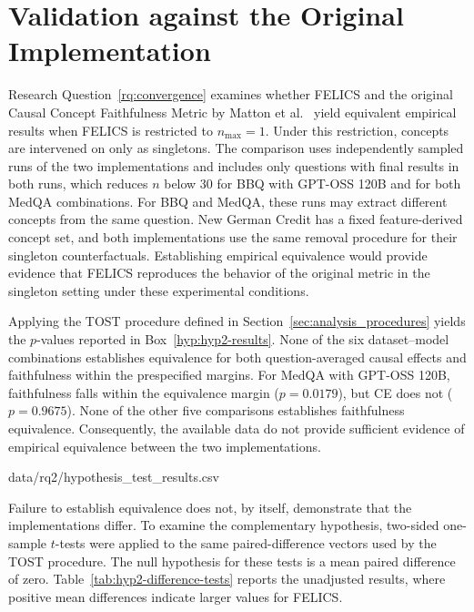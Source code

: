 \section{Validation against the Original Implementation}
\label{sec:results-original-validation}
Research Question~\ref{rq:convergence} examines whether FELICS and the original Causal Concept Faithfulness Metric by Matton et al.~\cite{mattonWalkTalkMeasuring2024} yield equivalent empirical results when FELICS is restricted to $n_{\max}=1$. Under this restriction, concepts are intervened on only as singletons. The comparison uses independently sampled runs of the two implementations and includes only questions with final results in both runs, which reduces $n$ below 30 for BBQ with GPT-OSS 120B and for both MedQA combinations. For BBQ and MedQA, these runs may extract different concepts from the same question. New German Credit has a fixed feature-derived concept set, and both implementations use the same removal procedure for their singleton counterfactuals. Establishing empirical equivalence would provide evidence that FELICS reproduces the behavior of the original metric in the singleton setting under these experimental conditions.

Applying the TOST procedure defined in Section~\ref{sec:analysis_procedures} yields the $p$-values reported in Box~\ref{hyp:hyp2-results}. None of the six dataset--model combinations establishes equivalence for both question-averaged causal effects and faithfulness within the prespecified margins. For MedQA with GPT-OSS 120B, faithfulness falls within the equivalence margin ($p=0.0179$), but CE does not ($p=0.9675$). None of the other five comparisons establishes faithfulness equivalence. Consequently, the available data do not provide sufficient evidence of empirical equivalence between the two implementations.

  {data/rq2/hypothesis_test_results.csv}

Failure to establish equivalence does not, by itself, demonstrate that the implementations differ. To examine the complementary hypothesis, two-sided one-sample $t$-tests were applied to the same paired-difference vectors used by the TOST procedure. The null hypothesis for these tests is a mean paired difference of zero. Table~\ref{tab:hyp2-difference-tests} reports the unadjusted results, where positive mean differences indicate larger values for FELICS.

